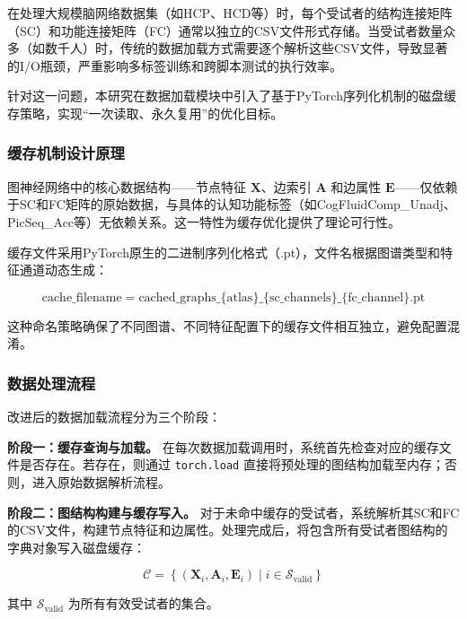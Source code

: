 在处理大规模脑网络数据集（如HCP、HCD等）时，每个受试者的结构连接矩阵（SC）和功能连接矩阵（FC）通常以独立的CSV文件形式存储。当受试者数量众多（如数千人）时，传统的数据加载方式需要逐个解析这些CSV文件，导致显著的I/O瓶颈，严重影响多标签训练和跨脚本测试的执行效率。

针对这一问题，本研究在数据加载模块中引入了基于PyTorch序列化机制的磁盘缓存策略，实现``一次读取、永久复用''的优化目标。

\subsubsection{缓存机制设计原理}

图神经网络中的核心数据结构——节点特征 $\mathbf{X}$、边索引 $\mathbf{A}$ 和边属性 $\mathbf{E}$——仅依赖于SC和FC矩阵的原始数据，与具体的认知功能标签（如CogFluidComp\_Unadj、PicSeq\_Acc等）无依赖关系。这一特性为缓存优化提供了理论可行性。

缓存文件采用PyTorch原生的二进制序列化格式（.pt），文件名根据图谱类型和特征通道动态生成：

\begin{equation}
\text{cache\_filename} = \text{cached\_graphs\_}\{\text{atlas}\}\_\{\text{sc\_channels}\}\_\{\text{fc\_channel}\}.\text{pt}
\end{equation}

这种命名策略确保了不同图谱、不同特征配置下的缓存文件相互独立，避免配置混淆。

\subsubsection{数据处理流程}

改进后的数据加载流程分为三个阶段：

\textbf{阶段一：缓存查询与加载。} 在每次数据加载调用时，系统首先检查对应的缓存文件是否存在。若存在，则通过 \texttt{torch.load} 直接将预处理的图结构加载至内存；否则，进入原始数据解析流程。

\textbf{阶段二：图结构构建与缓存写入。} 对于未命中缓存的受试者，系统解析其SC和FC的CSV文件，构建节点特征和边属性。处理完成后，将包含所有受试者图结构的字典对象写入磁盘缓存：

\begin{equation}
\mathcal{C} = \left\{ (\mathbf{X}_i, \mathbf{A}_i, \mathbf{E}_i) \mid i \in \mathcal{S}_{\text{valid}} \right\}
\end{equation}

其中 $\mathcal{S}_{\text{valid}}$ 为所有有效受试者的集合。

